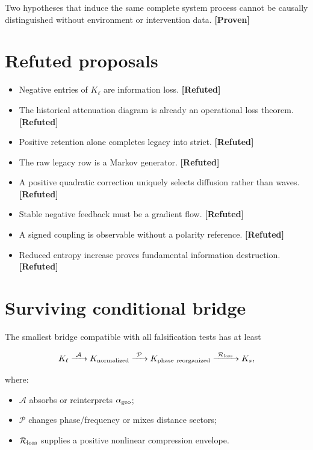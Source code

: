 \documentclass[11pt,a4paper,openany]{report}
\newcommand{\statusProven}{\textcolor{fingreen}{[Proven]}}
\newcommand{\statusRefuted}{\textcolor{finred}{[Refuted]}}
\begin{document}
Two hypotheses that induce the same complete system process cannot be causally distinguished without environment or intervention data. \textbf{\statusProven{}}

\section{Refuted proposals}

\begin{itemize}
\item 
Negative entries of \(K_\ell\) are information loss. \textbf{\statusRefuted{}}

\item 
The historical attenuation diagram is already an operational loss theorem. \textbf{\statusRefuted{}}

\item 
Positive retention alone completes legacy into strict. \textbf{\statusRefuted{}}

\item 
The raw legacy row is a Markov generator. \textbf{\statusRefuted{}}

\item 
A positive quadratic correction uniquely selects diffusion rather than waves. \textbf{\statusRefuted{}}

\item 
Stable negative feedback must be a gradient flow. \textbf{\statusRefuted{}}

\item 
A signed coupling is observable without a polarity reference. \textbf{\statusRefuted{}}

\item 
Reduced entropy increase proves fundamental information destruction. \textbf{\statusRefuted{}}

\end{itemize}

\section{Surviving conditional bridge}

The smallest bridge compatible with all falsification tests has at least

\[
K_\ell
\xrightarrow{\ \mathcal A\ }
K_{\rm normalized}
\xrightarrow{\ \mathcal P\ }
K_{\rm phase\ reorganized}
\xrightarrow{\ \mathcal R_{\rm loss}\ }
K_s,
\]

where:

\begin{itemize}
\item 
\(\mathcal{A}\) absorbs or reinterprets \(\alpha_{\rm geo}\);

\item 
\(\mathcal{P}\) changes phase/\allowbreak{}frequency or mixes distance sectors;

\item 
\(\mathcal{R}_{\rm loss}\) supplies a positive nonlinear compression envelope.

\end{itemize}
\end{document}

